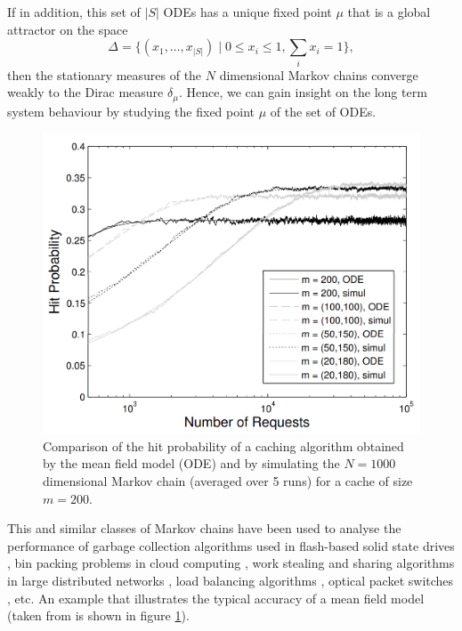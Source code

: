 \documentclass[12pt]{report}
\begin{document}
If in addition, this set of $|S|$ ODEs has a unique fixed point $\mu$ that is a global attractor on the space
$$
\Delta = \{(x_1,\dots,x_{|S|}) \mid 0 \leq x_i \leq 1, \sum_i x_i = 1\},
$$
then the stationary measures of the $N$ dimensional Markov chains converge weakly to the Dirac measure $\delta_\mu$. Hence, we can gain insight on the long term system behaviour by studying the fixed point $\mu$ of the set of ODEs.

\begin{figure}
	\includegraphics[scale=0.6]{figures/Chapter1/fig1.PNG}
	\caption{ Comparison of the hit probability of a caching algorithm obtained by the mean field model (ODE) and by
		simulating the $N=1000$ dimensional Markov chain (averaged over 5 runs) for a cache of size $m=200$.} \label{fig:gast}
\end{figure}

This and similar classes of Markov chains have been used to analyse the performance of garbage collection algorithms used in flash-based solid state drives \cite{vanhoudt31, vanhoudt32}, bin
packing problems in cloud computing \cite{xie1}, work stealing and sharing algorithms in large
distributed networks \cite{gast2010mean, minnebo2}, load balancing algorithms \cite{vvedenskaya3, mitzenmacher2001power}, optical packet switches \cite{van2012fluid}, etc. An example that
illustrates the typical accuracy of a mean field model (taken from \cite{gast2015sigmetrics} is shown in figure \ref{fig:gast}).
\end{document}
